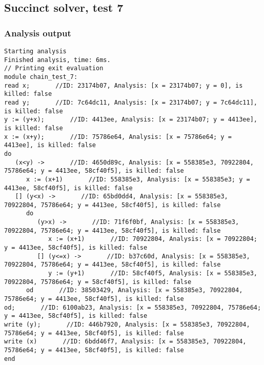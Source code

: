 \subsection{Succinct solver, test 7}
\subsubsection{Analysis output}
\begin{lstlisting}
Starting analysis
Finished analysis, time: 6ms.
// Printing exit evaluation
module chain_test_7:
read x;       //ID: 23174b07, Analysis: [x = 23174b07; y = 0], is killed: false
read y;       //ID: 7c64dc11, Analysis: [x = 23174b07; y = 7c64dc11], is killed: false
y := (y+x);       //ID: 4413ee, Analysis: [x = 23174b07; y = 4413ee], is killed: false
x := (x+y);       //ID: 75786e64, Analysis: [x = 75786e64; y = 4413ee], is killed: false
do
   (x<y) ->       //ID: 4650d89c, Analysis: [x = 558385e3, 70922804, 75786e64; y = 4413ee, 58cf40f5], is killed: false
      x := (x+1)       //ID: 558385e3, Analysis: [x = 558385e3; y = 4413ee, 58cf40f5], is killed: false
   [] (y<x) ->       //ID: 65bd0dd4, Analysis: [x = 558385e3, 70922804, 75786e64; y = 4413ee, 58cf40f5], is killed: false
      do
         (y>x) ->       //ID: 71f6f0bf, Analysis: [x = 558385e3, 70922804, 75786e64; y = 4413ee, 58cf40f5], is killed: false
            x := (x+1)       //ID: 70922804, Analysis: [x = 70922804; y = 4413ee, 58cf40f5], is killed: false
         [] (y<=x) ->       //ID: b37c60d, Analysis: [x = 558385e3, 70922804, 75786e64; y = 4413ee, 58cf40f5], is killed: false
            y := (y+1)       //ID: 58cf40f5, Analysis: [x = 558385e3, 70922804, 75786e64; y = 58cf40f5], is killed: false
      od       //ID: 38503429, Analysis: [x = 558385e3, 70922804, 75786e64; y = 4413ee, 58cf40f5], is killed: false
od;       //ID: 6100ab23, Analysis: [x = 558385e3, 70922804, 75786e64; y = 4413ee, 58cf40f5], is killed: false
write (y);       //ID: 446b7920, Analysis: [x = 558385e3, 70922804, 75786e64; y = 4413ee, 58cf40f5], is killed: false
write (x)       //ID: 6bdd46f7, Analysis: [x = 558385e3, 70922804, 75786e64; y = 4413ee, 58cf40f5], is killed: false
end
\end{lstlisting}
